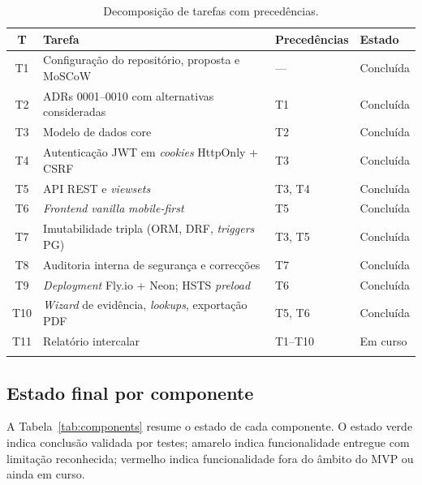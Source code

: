 \begin{longtable}{@{}cL{6.0cm}L{4.5cm}L{2.0cm}@{}}
\toprule
\textbf{T} & \textbf{Tarefa} & \textbf{Precedências} & \textbf{Estado} \\
\midrule
\endhead
T1  & Configuração do repositório, proposta e MoSCoW            & ---       & Concluída \\
T2  & ADRs 0001--0010 com alternativas consideradas             & T1        & Concluída \\
T3  & Modelo de dados core                                      & T2        & Concluída \\
T4  & Autenticação JWT em \emph{cookies} HttpOnly + CSRF        & T3        & Concluída \\
T5  & API REST e \emph{viewsets}                                & T3, T4    & Concluída \\
T6  & \emph{Frontend} \emph{vanilla} \emph{mobile-first}        & T5        & Concluída \\
T7  & Imutabilidade tripla (ORM, DRF, \emph{triggers} PG)       & T3, T5    & Concluída \\
T8  & Auditoria interna de segurança e correcções               & T7        & Concluída \\
T9  & \emph{Deployment} Fly.io + Neon; HSTS \emph{preload}      & T6        & Concluída \\
T10 & \emph{Wizard} de evidência, \emph{lookups}, exportação PDF & T5, T6   & Concluída \\
T11 & Relatório intercalar                                      & T1--T10   & Em curso \\
\bottomrule
\caption{Decomposição de tarefas com precedências.}
\label{tab:tasks}
\end{longtable}

\subsection{Estado final por componente}
\label{sec:components}

A Tabela~\ref{tab:components} resume o estado de cada componente. O
estado verde indica conclusão validada por testes; amarelo indica
funcionalidade entregue com limitação reconhecida; vermelho indica
funcionalidade fora do âmbito do MVP ou ainda em curso.

